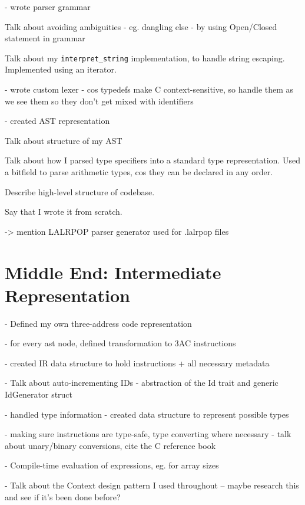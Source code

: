 \documentclass[00-main.tex]{subfiles}
\begin{document}
\begin{Comment}
- wrote parser grammar

Talk about avoiding ambiguities - eg. dangling else - by using Open/Closed statement in grammar

Talk about my \texttt{interpret\_string} implementation, to handle string escaping. Implemented using an iterator.

- wrote custom lexer - cos typedefs make C context-sensitive, so handle them as we see them so they don't get mixed with identifiers

- created AST representation

Talk about structure of my AST

Talk about how I parsed type specifiers into a standard type representation. Used a bitfield to parse arithmetic types, cos they can be declared in any order.
\end{Comment}

\begin{Comment}
Describe high-level structure of codebase.

Say that I wrote it from scratch.

-> mention LALRPOP parser generator used for .lalrpop files
\end{Comment}

\section{Middle End: Intermediate Representation}

\begin{Comment}
- Defined my own three-address code representation

- for every ast node, defined transformation to 3AC instructions

- created IR data structure to hold instructions + all necessary metadata

- Talk about auto-incrementing IDs - abstraction of the Id trait and generic IdGenerator struct

- handled type information - created data structure to represent possible types

- making sure instructions are type-safe, type converting where necessary - talk about unary/binary conversions, cite the C reference book

- Compile-time evaluation of expressions, eg. for array sizes

- Talk about the Context design pattern I used throughout -- maybe research this and see if it's been done before?
\end{Comment}
\end{document}

